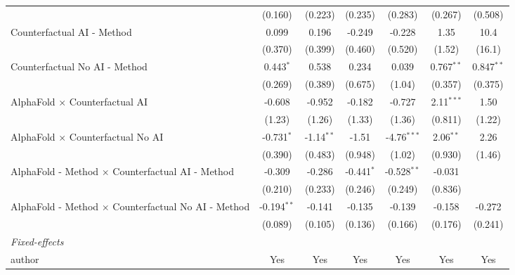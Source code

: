 \begin{tabular}{lcccccc}
                                                              & (0.160)       & (0.223)       & (0.235)      & (0.283)       & (0.267)      & (0.508)\\   
   Counterfactual AI - Method                                 & 0.099         & 0.196         & -0.249       & -0.228        & 1.35         & 10.4\\   
                                                              & (0.370)       & (0.399)       & (0.460)      & (0.520)       & (1.52)       & (16.1)\\   
   Counterfactual No AI - Method                              & 0.443$^{*}$   & 0.538         & 0.234        & 0.039         & 0.767$^{**}$ & 0.847$^{**}$\\   
                                                              & (0.269)       & (0.389)       & (0.675)      & (1.04)        & (0.357)      & (0.375)\\   
   AlphaFold $\times$ Counterfactual AI                       & -0.608        & -0.952        & -0.182       & -0.727        & 2.11$^{***}$ & 1.50\\   
                                                              & (1.23)        & (1.26)        & (1.33)       & (1.36)        & (0.811)      & (1.22)\\   
   AlphaFold $\times$ Counterfactual No AI                    & -0.731$^{*}$  & -1.14$^{**}$  & -1.51        & -4.76$^{***}$ & 2.06$^{**}$  & 2.26\\   
                                                              & (0.390)       & (0.483)       & (0.948)      & (1.02)        & (0.930)      & (1.46)\\   
   AlphaFold - Method $\times$ Counterfactual AI - Method     & -0.309        & -0.286        & -0.441$^{*}$ & -0.528$^{**}$ & -0.031       &   \\   
                                                              & (0.210)       & (0.233)       & (0.246)      & (0.249)       & (0.836)      &   \\   
   AlphaFold - Method $\times$ Counterfactual No AI - Method  & -0.194$^{**}$ & -0.141        & -0.135       & -0.139        & -0.158       & -0.272\\   
                                                              & (0.089)       & (0.105)       & (0.136)      & (0.166)       & (0.176)      & (0.241)\\   
   \midrule
   \emph{Fixed-effects}\\
   author                                                     & Yes           & Yes           & Yes          & Yes           & Yes          & Yes\\  

\end{tabular}
